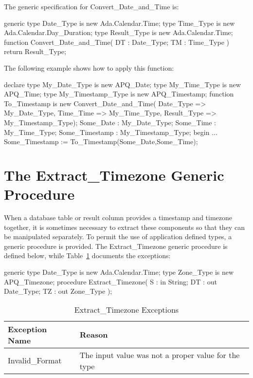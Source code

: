 \documentclass[english,letterpaper]{book}
\begin{document}
The generic specification for Convert\_Date\_and\_Time is:

\begin{Code}
generic
   type Date_Type is new Ada.Calendar.Time;
   type Time_Type is new Ada.Calendar.Day_Duration;
   type Result_Type is new Ada.Calendar.Time;
function Convert_Date_and_Time(
   DT : Date_Type;
   TM : Time_Type
) return Result_Type;
\end{Code}

The following example shows how to apply this function:

\begin{Example}
declare
   type My_Date_Type is new APQ_Date;
   type My_Time_Type is new APQ_Time; 
   type My_Timestamp_Type is new APQ_Timestamp;
   function To_Timestamp is new 
      Convert_Date_and_Time(
         Date_Type => My_Date_Type,
         Time_Time => My_Time_Type,
         Result_Type => My_Timestamp_Type);
   Some_Date :      My_Date_Type;
   Some_Time :      My_Time_Type;
   Some_Timestamp : My_Timestamp_Type;
begin
   ...
   Some_Timestamp := To_Timestamp(Some_Date,Some_Time);
\end{Example}

\section{The Extract\_Timezone Generic Procedure}

When a database table or result column provides a timestamp and timezone
together, it is sometimes necessary to extract these
components so that they can be manipulated separately. To permit the
use of application defined types, a generic procedure is provided.
The Extract\_Timezone generic procedure is defined below,
while Table~\ref{t:xtzx} documents the exceptions:

\begin{Code}
generic
   type Date_Type is new Ada.Calendar.Time;
   type Zone_Type is new APQ_Timezone;
procedure Extract_Timezone(
   S :  in     String;
   DT :    out Date_Type;
   TZ :    out Zone_Type
);
\end{Code}

\begin{table}
   \begin{center}
      \begin{tabular}{ll}
         Exception Name    &  Reason\\
         \hline 
         Invalid\_Format   &  The input value was not a proper value for the type\\
      \end{tabular}
   \end{center}
   \caption{Extract\_Timezone Exceptions}\label{t:xtzx}
\end{table}
\end{document}

